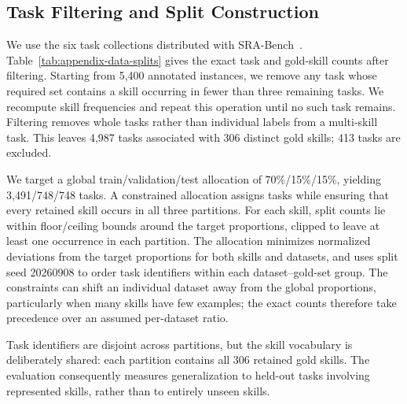 \subsection{Task Filtering and Split Construction}
\label{app:data-splits}
We use the six task collections distributed with SRA-Bench~\citep{su2026skillretrieval}. Table~\ref{tab:appendix-data-splits} gives the exact task and gold-skill counts after filtering. Starting from 5,400 annotated instances, we remove any task whose required set contains a skill occurring in fewer than three remaining tasks. We recompute skill frequencies and repeat this operation until no such task remains. Filtering removes whole tasks rather than individual labels from a multi-skill task. This leaves 4,987 tasks associated with 306 distinct gold skills; 413 tasks are excluded.

We target a global train/validation/test allocation of 70\%/15\%/15\%, yielding 3,491/748/748 tasks. A constrained allocation assigns tasks while ensuring that every retained skill occurs in all three partitions. For each skill, split counts lie within floor/ceiling bounds around the target proportions, clipped to leave at least one occurrence in each partition. The allocation minimizes normalized deviations from the target proportions for both skills and datasets, and uses split seed 20260908 to order task identifiers within each dataset--gold-set group. The constraints can shift an individual dataset away from the global proportions, particularly when many skills have few examples; the exact counts therefore take precedence over an assumed per-dataset ratio.

Task identifiers are disjoint across partitions, but the skill vocabulary is deliberately shared: each partition contains all 306 retained gold skills. The evaluation consequently measures generalization to held-out tasks involving represented skills, rather than to entirely unseen skills.

